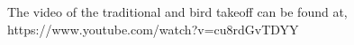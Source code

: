 \documentclass[applsci,article,accept,moreauthors,pdftex]{Definitions/mdpi}
\begin{document}
			
			
			
The video of the traditional and bird takeoff can be found at, https://www.youtube.com/watch?v=cu8rdGvTDYY
			
			
\end{document}
